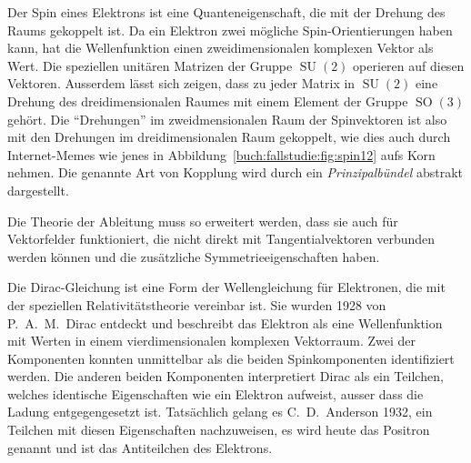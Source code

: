 Der Spin eines Elektrons ist eine Quanteneigenschaft, die mit der
%
%
Drehung des Raums gekoppelt ist.
Da ein Elektron zwei mögliche Spin-Orientierungen haben kann, hat
die Wellenfunktion einen zweidimensionalen komplexen Vektor als Wert.
Die speziellen unitären Matrizen der Gruppe $\operatorname{SU}(2)$ 
operieren auf diesen Vektoren.
%
Ausserdem lässt sich zeigen, dass zu jeder Matrix in $\operatorname{SU}(2)$
eine Drehung des dreidimensionalen Raumes mit einem Element der
Gruppe $\operatorname{SO}(3)$ gehört.
%
Die ``Drehungen'' im zweidmensionalen Raum der Spinvektoren ist also
mit den Drehungen im dreidimensionalen Raum gekoppelt, wie dies auch
durch Internet-Memes wie jenes in Abbildung~\ref{buch:fallstudie:fig:spin12}
aufs Korn nehmen.
Die genannte Art von Kopplung wird durch ein {\em Prinzipalbündel}
%
abstrakt dargestellt.

\begin{aufgabe}
Die Theorie der Ableitung muss so erweitert werden, dass sie auch für
Vektorfelder funktioniert, die nicht direkt mit Tangentialvektoren
verbunden werden können und die zusätzliche Symmetrieeigenschaften
haben.
\end{aufgabe}

Die Dirac-Gleichung ist eine Form der Wellengleichung für Elektronen,
%
die mit der speziellen Relativitätstheorie vereinbar ist.
%
Sie wurden 1928 von P.~A.~M.~Dirac entdeckt und beschreibt das Elektron
als eine Wellenfunktion mit Werten in einem vierdimensionalen komplexen
%
Vektorraum.
Zwei der Komponenten konnten unmittelbar als die beiden Spinkomponenten
identifiziert werden.
Die anderen beiden Komponenten interpretiert Dirac als ein Teilchen,
%
welches identische Eigenschaften wie ein Elektron aufweist, ausser dass
die Ladung entgegengesetzt ist.
Tatsächlich gelang es C.~D.~Anderson 1932, ein Teilchen mit diesen
%
Eigenschaften nachzuweisen, es wird heute das Positron genannt und ist
das Antiteilchen des Elektrons.
%
%





